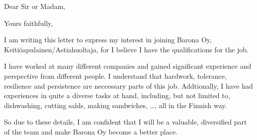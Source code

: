 \documentclass[11pt,a4paper,sans]{moderncv}
\begin{document}
  \clearpage
  \date{March 6, 2020}
  \opening{Dear Sir or Madam,}
  \closing{Yours faithfully,}
  \makelettertitle

  I am writing this letter to express my interest in joining Barona Oy,
  Keitiöapulainen/Astiahuoltaja, for
  I believe I have the qualifications for the job.

  I have worked at many different companies and gained significant experience and perspective
  from different people. I understand that hardwork, tolerance, resilience and persistence
  are neccessary parts of this job. Addtionally, I have had experiences in quite
  a diverse tasks at hand, including, but not limited to, dishwashing, cutting
  salds, making sandwiches, \ldots, all in the Finnish way.

  So due to these details, I am confident that I will be a valuable, diversified
  part of the team and make Barona Oy become a better place.

  \makeletterclosing
\end{document}
